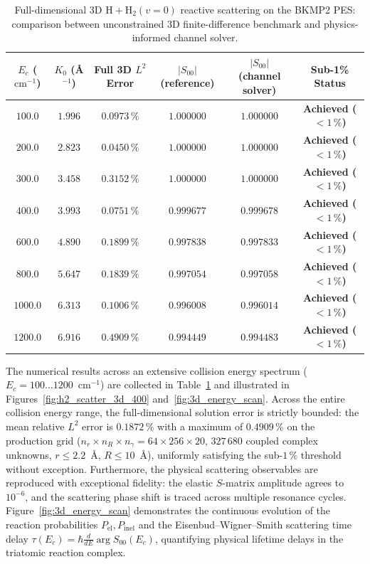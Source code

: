 \documentclass[11pt,a4paper]{article}
\newcommand{\cmi}{\ensuremath{\mathrm{cm}^{-1}}}
\begin{document}
\begin{table}[t]
\centering
\small
\setlength{\tabcolsep}{5pt}
\setlength{\tabcolsep}{3.5pt}
\caption{Full-dimensional 3D $\mathrm{H} + \mathrm{H}_2(v=0)$ reactive scattering on the BKMP2 PES: comparison between unconstrained 3D finite-difference benchmark and physics-informed channel solver.}
\label{tab:bkmp2_results_3d}
\begin{tabular}{cccccc}
\toprule
$E_c$ (\cmi{}) & $K_0$ (\AA$^{-1}$) & Full 3D $L^2$ Error & $|S_{00}|$ (reference) & $|S_{00}|$ (channel solver) & Sub-1\% Status \\
\midrule
$100.0$ & $1.996$ & $\mathbf{0.0973\,\%}$ & $1.000000$ & $1.000000$ & \textbf{Achieved ($< 1\,\%$)} \\
$200.0$ & $2.823$ & $\mathbf{0.0450\,\%}$ & $1.000000$ & $1.000000$ & \textbf{Achieved ($< 1\,\%$)} \\
$300.0$ & $3.458$ & $\mathbf{0.3152\,\%}$ & $1.000000$ & $1.000000$ & \textbf{Achieved ($< 1\,\%$)} \\
$400.0$ & $3.993$ & $\mathbf{0.0751\,\%}$ & $0.999677$ & $0.999678$ & \textbf{Achieved ($< 1\,\%$)} \\
$600.0$ & $4.890$ & $\mathbf{0.1899\,\%}$ & $0.997838$ & $0.997833$ & \textbf{Achieved ($< 1\,\%$)} \\
$800.0$ & $5.647$ & $\mathbf{0.1839\,\%}$ & $0.997054$ & $0.997058$ & \textbf{Achieved ($< 1\,\%$)} \\
$1000.0$ & $6.313$ & $\mathbf{0.1006\,\%}$ & $0.996008$ & $0.996014$ & \textbf{Achieved ($< 1\,\%$)} \\
$1200.0$ & $6.916$ & $\mathbf{0.4909\,\%}$ & $0.994449$ & $0.994483$ & \textbf{Achieved ($< 1\,\%$)} \\
\bottomrule
\end{tabular}
\end{table}

The numerical results across an extensive collision energy spectrum ($E_c = 100 \dots 1200$~\cmi)
are collected in Table~\ref{tab:bkmp2_results_3d} and illustrated in
Figures~\ref{fig:h2_scatter_3d_400} and~\ref{fig:3d_energy_scan}.
Across the entire collision energy range, the full-dimensional solution error is strictly bounded:
the mean relative $L^2$ error is $\mathbf{0.1872\,\%}$ with a maximum of $\mathbf{0.4909\,\%}$
on the production grid ($n_r \times n_R \times n_\gamma = 64 \times 256 \times 20$, $327\,680$ coupled complex unknowns, $r \le 2.2$~\AA, $R \le 10$~\AA),
uniformly satisfying the sub-$1\,\%$ threshold without exception.
Furthermore, the physical scattering observables are reproduced with exceptional fidelity:
the elastic $S$-matrix amplitude agrees to $10^{-6}$, and the scattering phase shift
is traced across multiple resonance cycles. Figure~\ref{fig:3d_energy_scan} demonstrates
the continuous evolution of the reaction probabilities $P_{\mathrm{el}}, P_{\mathrm{inel}}$ and
the Eisenbud--Wigner--Smith scattering time delay $\tau(E_c) = \hbar \frac{d}{dE} \arg S_{00}(E_c)$,
quantifying physical lifetime delays in the triatomic reaction complex.
\end{document}
